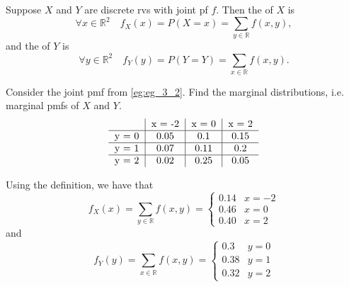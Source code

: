 \documentclass[notoc,notitlepage]{tufte-book}
\begin{document}
\begin{defn}
\label{defn:marginal_distribution_discrete_case}
  Suppose $X$ and $Y$ are discrete rvs with joint pf $f$. Then the  of $X$ is 
  \begin{equation*}
    \forall x \in \mathbb{R}^2 \quad f_X (x) = P(X = x) = \sum_{y \in \mathbb{R}} f(x, y),
  \end{equation*}
  and the  of $Y$ is
  \begin{equation*}
    \forall y \in \mathbb{R}^2 \quad f_Y (y) = P(Y = Y) = \sum_{x \in \mathbb{R}} f(x, y).
  \end{equation*}
\end{defn}

\begin{eg}[Example 3.4]
  Consider the joint pmf from \cref{eg:eg_3_2}. Find the marginal distributions, i.e. marginal pmfs of $X$ and $Y$.
  \[
  \begin{tabular}{c | c | c | c}
          & x = -2 & x = 0 & x = 2 \\
    \hline
    y = 0 & 0.05   & 0.1   & 0.15 \\
    \hline
    y = 1 & 0.07   & 0.11  & 0.2 \\
    \hline
    y = 2 & 0.02   & 0.25  & 0.05
  \end{tabular}
  \]

  \begin{solution}
    Using the definition, we have that
    \begin{equation*}
      f_X(x) = \sum_{y \in \mathbb{R}} f(x, y) = \begin{cases}
        0.14 & x = -2 \\
        0.46 & x = 0 \\
        0.40 & x = 2
      \end{cases}
    \end{equation*}
    and
    \begin{equation*}
      f_Y(y) = \sum_{x \in \mathbb{R}} f(x, y) = \begin{cases}
        0.3  & y = 0 \\
        0.38 & y = 1 \\
        0.32 & y = 2
      \end{cases}
    \end{equation*}
  \end{solution}
\end{eg}
\end{document}
